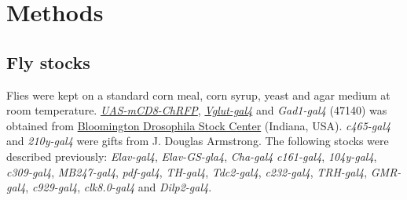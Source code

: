 \section*{Methods}

\subsection*{Fly stocks}

Flies were kept on a standard corn meal, corn syrup, yeast and agar medium at room temperature.
\href{http://flystocks.bio.indiana.edu/Reports/27392.html}{\emph{UAS-mCD8-ChRFP}}, \href{http://flystocks.bio.indiana.edu/Reports/26160.html}{\emph{Vglut-gal4}} and \emph{Gad1-gal4} (47140) was obtained from \href{http://flystocks.bio.indiana.edu}{Bloomington Drosophila Stock Center} (Indiana, USA).
\emph{c465-gal4} and \emph{210y-gal4} were gifts from J. Douglas Armstrong\cite{Young:2010jq}.
The following stocks were described previously: \emph{Elav-gal4}\cite{Lin:1994vn}, \emph{Elav-GS-gla4}\cite{Osterwalder_2001}, \emph{Cha-gal4}\cite{Kitamoto:2001ue} \emph{c161-gal4}\cite{renn:1999aa}, \emph{104y-gal4}\cite{sakai:2006aa}, \emph{c309-gal4}\cite{connolly:1996aa}, \emph{MB247-gal4}\cite{zars:2000aa}, \emph{pdf-gal4}\cite{renn:1999ab}, \emph{TH-gal4}\cite{friggi-grelin:2003aa}, \emph{Tdc2-gal4}\cite{alekseyenko:2010aa}, \emph{c232-gal4}\cite{renn:1999aa}, \emph{TRH-gal4}\cite{alekseyenko:2010aa}, \emph{GMR-gal4}\cite{freeman:1996aa}, \emph{c929-gal4}\cite{taghert:2001aa}, \emph{clk8.0-gal4}\cite{glossop:2003aa} and \emph{Dilp2-gal4}\cite{Rulifson:2002cg}. 
  
  
  
  
  
  
  